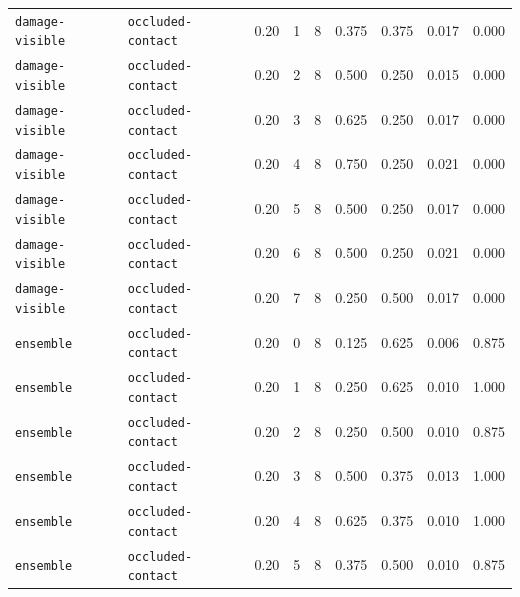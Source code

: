 \documentclass{article}
\begin{document}
\begin{center}
\begin{tabular}{llccccccc}
\texttt{damage-visible} & \texttt{occluded-contact} & 0.20 & 1 & 8 & 0.375 & 0.375 & 0.017 & 0.000 \\
\texttt{damage-visible} & \texttt{occluded-contact} & 0.20 & 2 & 8 & 0.500 & 0.250 & 0.015 & 0.000 \\
\texttt{damage-visible} & \texttt{occluded-contact} & 0.20 & 3 & 8 & 0.625 & 0.250 & 0.017 & 0.000 \\
\texttt{damage-visible} & \texttt{occluded-contact} & 0.20 & 4 & 8 & 0.750 & 0.250 & 0.021 & 0.000 \\
\texttt{damage-visible} & \texttt{occluded-contact} & 0.20 & 5 & 8 & 0.500 & 0.250 & 0.017 & 0.000 \\
\texttt{damage-visible} & \texttt{occluded-contact} & 0.20 & 6 & 8 & 0.500 & 0.250 & 0.021 & 0.000 \\
\texttt{damage-visible} & \texttt{occluded-contact} & 0.20 & 7 & 8 & 0.250 & 0.500 & 0.017 & 0.000 \\
\texttt{ensemble} & \texttt{occluded-contact} & 0.20 & 0 & 8 & 0.125 & 0.625 & 0.006 & 0.875 \\
\texttt{ensemble} & \texttt{occluded-contact} & 0.20 & 1 & 8 & 0.250 & 0.625 & 0.010 & 1.000 \\
\texttt{ensemble} & \texttt{occluded-contact} & 0.20 & 2 & 8 & 0.250 & 0.500 & 0.010 & 0.875 \\
\texttt{ensemble} & \texttt{occluded-contact} & 0.20 & 3 & 8 & 0.500 & 0.375 & 0.013 & 1.000 \\
\texttt{ensemble} & \texttt{occluded-contact} & 0.20 & 4 & 8 & 0.625 & 0.375 & 0.010 & 1.000 \\
\texttt{ensemble} & \texttt{occluded-contact} & 0.20 & 5 & 8 & 0.375 & 0.500 & 0.010 & 0.875 \\
\bottomrule
\end{tabular}
\end{center}
\end{document}
